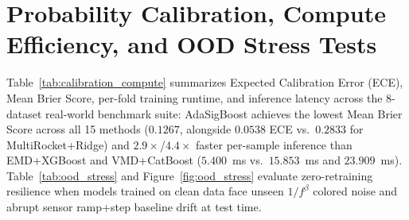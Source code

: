 \begin{table}[h]
\centering
\caption{Summary of the 8-dataset multi-domain evaluation suite and leak-free splitting protocols.}
\label{tab:datasets_audit}
\end{table}

\section{Probability Calibration, Compute Efficiency, and OOD Stress Tests}
\label{app:ood}
Table~\ref{tab:calibration_compute} summarizes Expected Calibration Error (ECE), Mean Brier Score, per-fold training runtime, and inference latency across the 8-dataset real-world benchmark suite: AdaSigBoost achieves the lowest Mean Brier Score across all 15 methods ($0.1267$, alongside $0.0538$ ECE vs.\ $0.2833$ for MultiRocket+Ridge) and $2.9\times$/$4.4\times$ faster per-sample inference than EMD+XGBoost and VMD+CatBoost ($5.400$~ms vs.\ $15.853$~ms and $23.909$~ms). Table~\ref{tab:ood_stress} and Figure~\ref{fig:ood_stress} evaluate zero-retraining resilience when models trained on clean data face unseen $1/f^\beta$ colored noise and abrupt sensor ramp+step baseline drift at test time.

